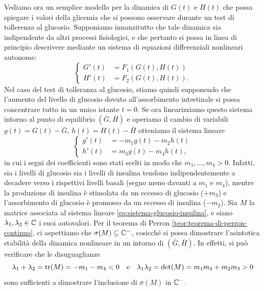 Vediamo ora un semplice modello per la dinamica di $G(t)$ e $H(t)$
che possa spiegare i valori della glicemia che si possono osservare
durante un test di tollerenza al glucosio. Supponiamo innanzitutto che tale
dinamica sia indipendente da altri processi fisiologici, e che pertanto si possa
in linea di principio descrivere mediante un sistema di equazioni differenziali
nonlineari autonome:
\[
\left\{
\begin{aligned}
G'(t)  &= F_1(G(t),H(t)) \\
H'(t)  &= F_2(G(t),H(t)).
\end{aligned}
\right.
\]
Nel caso del test di tolleranza al glucosio, stiamo quindi supponendo che
l'aumento del livello di glucosio dovuto all'assorbimento intestinale
si possa concentrare tutto in un unico istante $t=0$.
Se ora linearizziamo questo sistema intorno al punto di equilibrio
$(\bar{G},\bar{H})$ e operiamo il cambio di variabili $g(t) = G(t)-\bar{G}$,
$h(t) = H(t)-\bar{H}$ otteniamo il sistema lineare
\begin{equation} \label{eq:sistema-glucosio-insulina}
\left\{
\begin{aligned}
g'(t)  &= -m_1 g(t) -m_2 h(t) \\
h'(t)  &=  m_3 g(t) -m_4 h(t),
\end{aligned}
\right.
\end{equation}
in cui i segni dei coefficienti sono stati scelti in modo che $m_1,\dots,m_4 > 0$.
Infatti, sia i livelli di glucosio sia i livelli di insulina tendono indipendentemente
a decadere verso i rispettivi livelli basali (segno meno davanti a $m_1$ e $m_4$),
mentre la produzione di insulina è stimolata da un eccesso di glucosio ($+m_3$)
e l'assorbimento di glucosio è promosso da un eccesso di insulina ($-m_2$).
Sia $M$ la matrice associata al sistema lineare \eqref{eq:sistema-glucosio-insulina},
e siano $\lambda_1,\lambda_2 \in \mathbb{C}$ i suoi autovalori. Per il teorema di Perron
\ref{teor:teorema-di-perron-continuo}, ci aspettiamo che $\sigma(M) \subseteq \mathbb{C}^-$,
cosicché si possa dimostrare l'asintotica stabilità della dinamica nonlineare
in un intorno di $(\bar{G},\bar{H})$. In effetti, si può verificare che le
disuguaglianze
\[
\lambda_1 + \lambda_2 = \operatorname{tr}(M) = -m_1-m_4 < 0
\quad \text{e} \quad
\lambda_1 \lambda_2 = \det(M) = m_1 m_4 + m_2 m_3 > 0
\]
sono sufficienti a dimostrare l'inclusione di $\sigma(M)$ in $\mathbb{C}^-$.

